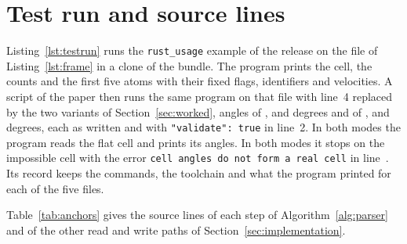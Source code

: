 \documentclass[preprint,12pt]{elsarticle}
\begin{document}
\FloatBarrier \section{Test run and source lines}\label{sec:supp-testrun} Listing~\ref{lst:testrun} runs the \texttt{rust\_usage} example of the release on the file of Listing~\ref{lst:frame} in a clone of the bundle.
The program prints the cell, the counts and the first five atoms with their fixed flags, identifiers and velocities.
A script of the paper then runs the same program on that file with line~4 replaced by the two variants of Section~\ref{sec:worked}, angles of \wkFlatAlpha, \wkFlatBeta{} and \wkFlatGamma{} degrees and of \wkNoneAlpha, \wkNoneAlpha{} and \wkNoneGamma{} degrees, each as written and with \texttt{"validate": true} in line~2.
In both modes the program reads the flat cell and prints its angles.
In both modes it stops on the impossible cell with the error \texttt{cell angles do not form a real cell} in line~\trCellLine.
Its record keeps the commands, the toolchain and what the program printed for each of the five files.



Table~\ref{tab:anchors} gives the source lines of each step of Algorithm~\ref{alg:parser} and of the other read and write paths of Section~\ref{sec:implementation}.
\end{document}
